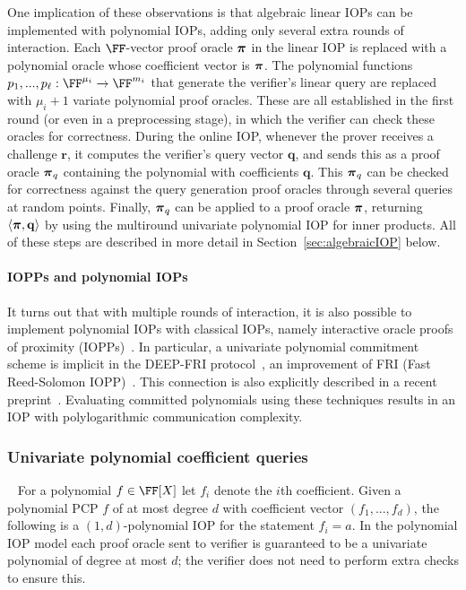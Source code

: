 One implication of these observations is that algebraic linear IOPs can be implemented with polynomial IOPs, adding only several extra rounds of interaction. Each $\FF$-vector proof oracle $\boldsymbol{\pi}$ in the linear IOP is replaced with a polynomial oracle whose coefficient vector is $\boldsymbol{\pi}$. The polynomial functions $p_1,...,p_\ell: \FF^{\mu_i} \rightarrow \FF^{m_i}$ that generate the verifier's linear query are replaced with $\mu_i+1$ variate polynomial proof oracles. These are all established in the first round (or even in a preprocessing stage), in which the verifier can check these oracles for correctness. During the online IOP, whenever the prover receives a challenge $\mathbf{r}$, it computes the verifier's query vector $\mathbf{q}$, and sends this as a proof oracle $\boldsymbol{\pi}_q$ containing the polynomial with coefficients $\mathbf{q}$. This $\boldsymbol{\pi}_q$ can be checked for correctness against the query generation proof oracles through several queries at random points. Finally, $\boldsymbol{\pi}_q$ can be applied to a proof oracle $\boldsymbol{\pi}$, returning $\langle \boldsymbol{\pi}, \mathbf{q} \rangle$ by using the multiround univariate polynomial IOP for inner products. All of these steps are described in more detail in Section~\ref{sec:algebraicIOP} below. 

\paragraph{IOPPs and polynomial IOPs} It turns out that with multiple rounds of interaction, it is also possible to implement polynomial IOPs with classical IOPs, namely interactive oracle proofs of proximity (IOPPs)~\cite{STOC:ReiRotRot16,TCC:BenChiSpo16}. In particular, a univariate polynomial commitment scheme is implicit in the DEEP-FRI protocol~\cite{ECCC:BGKS19}, an improvement of FRI (Fast Reed-Solomon IOPP)~\cite{ICALP:BBHR18}. This connection is also explicitly described in a recent preprint~\cite{MatterLabs}. Evaluating committed polynomials using these techniques results in an IOP with polylogarithmic communication complexity.


\subsubsection{Univariate polynomial coefficient queries}~\label{sec:opencoefficient} 
For a polynomial $f \in \FF[X]$ let $f_i$ denote the $i$th coefficient. Given a polynomial PCP $f$ of at most degree $d$ with coefficient vector $(f_1,...,f_d)$, the following is a $(1, d)$-polynomial IOP for the statement $f_i = a$. In the polynomial IOP model each proof oracle sent to verifier is guaranteed to be a univariate polynomial of degree at most $d$; the verifier does not need to perform extra checks to ensure this.


